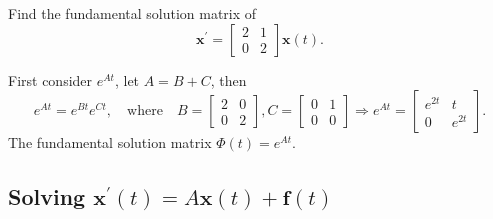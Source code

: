 \begin{example}{}{}
  Find the fundamental solution matrix of
  \begin{equation}
    \mathbf{x}^{\prime} =
    \begin{bmatrix}
      2 & 1\\
      0 & 2
    \end{bmatrix} \mathbf{x}(t).
  \end{equation}
\end{example}

\begin{solution}
  First consider $e^{At}$, let $A = B + C$, then
  \begin{equation}
    e^{At} = e^{Bt}e^{Ct}, \quad
    \text{where} \quad
    B =
    \begin{bmatrix}
      2 & 0\\
      0 & 2
    \end{bmatrix}, C =
    \begin{bmatrix}
      0 & 1\\
      0 & 0
    \end{bmatrix}
    \Rightarrow e^{At} =
    \begin{bmatrix}
      e^{2t} & t\\
      0 & e^{2t}
    \end{bmatrix}.
  \end{equation}
  The fundamental solution matrix $\Phi(t) = e^{At}$.
\end{solution}

\subsection{Solving $\mathbf{x}^{\prime}(t) = A \mathbf{x}(t) + \mathbf{f}(t)$}





